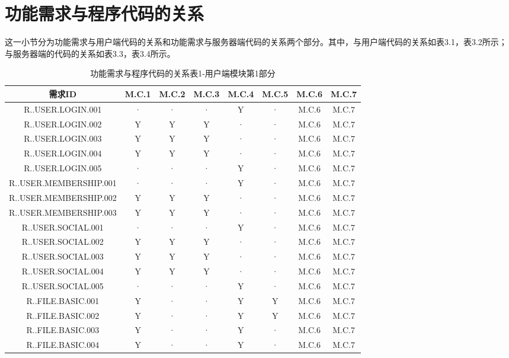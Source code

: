 \section{功能需求与程序代码的关系}
这一小节分为功能需求与用户端代码的关系和功能需求与服务器端代码的关系两个部分。其中，与用户端代码的关系如表3.1，表3.2所示；与服务器端的代码的关系如表3.3，表3.4所示。
\begin{table}[htbp]
\centering
\caption{功能需求与程序代码的关系表1-用户端模块第1部分} \label{tab:requirement-module}
\begin{tabular}{|c|c|c|c|c|c||c|c|}
    \hline 
    需求ID & M.C.1 & M.C.2 & M.C.3 & M.C.4 & M.C.5 &M.C.6 & M.C.7\\
    \hline 
    R..USER.LOGIN.001 &· &· &· & Y  &· &M.C.6 & M.C.7\\
    \hline
    R..USER.LOGIN.002 & Y & Y &Y  &·  &· &M.C.6 & M.C.7\\
    \hline 
    R..USER.LOGIN.003 & Y & Y & Y &·  &· &M.C.6 & M.C.7\\
    \hline
    R..USER.LOGIN.004 & Y & Y & Y &·   &· &M.C.6 & M.C.7\\
    \hline
    R..USER.LOGIN.005 &· &· &· & Y  &· &M.C.6 & M.C.7\\
    \hline
    R..USER.MEMBERSHIP.001 &· &· &· & Y  &· &M.C.6 & M.C.7\\
    \hline
    R..USER.MEMBERSHIP.002 & Y & Y &Y  &·  &· &M.C.6 & M.C.7\\
    \hline 
    R..USER.MEMBERSHIP.003 & Y & Y & Y &·  &· &M.C.6 & M.C.7\\
    \hline
    R..USER.SOCIAL.001 &· &· &· & Y  &· &M.C.6 & M.C.7\\
    \hline
    R..USER.SOCIAL.002 & Y & Y &Y  &·  &· &M.C.6 & M.C.7\\
    \hline 
    R..USER.SOCIAL.003 & Y & Y & Y &·  &· &M.C.6 & M.C.7\\
    \hline
    R..USER.SOCIAL.004 & Y & Y & Y &·   &· &M.C.6 & M.C.7\\
    \hline
    R..USER.SOCIAL.005 &· &· &· & Y  &· &M.C.6 & M.C.7\\
    \hline
    R..FILE.BASIC.001 & Y &· &· & Y  & Y &M.C.6 & M.C.7\\
    \hline
    R..FILE.BASIC.002 & Y &· &· &  Y & Y &M.C.6 & M.C.7\\
    \hline 
    R..FILE.BASIC.003 & Y  &·  & · &Y   &· &M.C.6 & M.C.7\\
    \hline
    R..FILE.BASIC.004 & Y  &·  & · &Y  &· &M.C.6 & M.C.7\\
    \hline     

\end{tabular}
\end{table}
